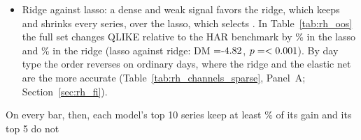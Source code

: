 \begin{itemize}
\begin{itemize}
    \rhldEBEnetBarPTenFull), and with 20 series it is not significant in any class ($p$ from
    \rhldEBLinPTwentyFullMin{} to \rhldEBLinPTwentyFullMax). The top 5 keep \rhldEBLinRFiveMin{}--\rhldEBLinRFiveMax\%
    of the gain; the full set is significantly more accurate than them in the lasso ($p = \rhldEBLassoBarPFiveFull$)
    and the elastic net ($p = \rhldEBEnetBarPFiveFull$), and the ridge's $p$ is \rhldEBRidgeBarPFiveFull. The lasso's
    single top series, \rhldEBLassoTopOne, alone keeps \rhldEBLassoBarROne\%. Refitted monthly, as in the
    pre-specified design (dashed in Figure~\ref{fig:rh_ladder}), the same rungs kept
    \rhldLinRTenMin{}--\rhldLinRTenMax\% of their monthly gain with 10 series and \rhldLinRFiveMin{}--\rhldLinRFiveMax\%
    with 5: a month's hold raises the loss of the full set by \rhldEBLinPctMonthlyFullMin{} to
    \rhldEBLinPctMonthlyFullMax\% but that of the 10-series rung by at most \rhldEBLinPctMonthlyTenMax\%.
  \item Ridge against lasso: a dense and weak signal favors the ridge, which keeps and shrinks every series, over the
    lasso, which selects \citep[see][]{GiannoneLenzaPrimiceri2021}. In Table~\ref{tab:rh_oos} the full set changes
    QLIKE relative to the HAR benchmark by \rhorVsOlsPctLassoFull\% in the lasso and \rhorVsOlsPctRidgeFull\% in the
    ridge (lasso against ridge: DM $= \rhldDmLassoRidge{}$, $p = <0.001{}$). By day type the order
    reverses on ordinary days, where the ridge and the elastic net are the more accurate
    (Table~\ref{tab:rh_channels_sparse}, Panel~A; Section~\ref{sec:rh_fi}).
  \end{itemize}
  On every bar, then, each model's top 10 series keep at least \rhldRulePct\% of its gain and its top 5 do not

\end{itemize}
